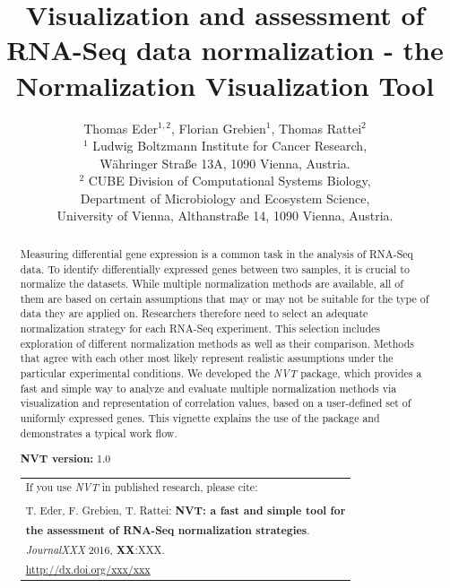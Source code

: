 \documentclass[11pt]{article}\usepackage[]{graphicx}\usepackage[usenames,dvipsnames]{color}
\author{Thomas Eder$^{1,2}$, Florian Grebien$^{1}$, Thomas Rattei$^{2}$\\[1em]
  \small{$^{1}$ Ludwig Boltzmann Institute for Cancer Research,} \\
  \small{W{\"a}hringer Stra{\ss}e 13A, 1090 Vienna, Austria.} \\
  \small{$^{2}$ CUBE Division of Computational Systems Biology,} \\
  \small{Department of Microbiology and Ecosystem Science,} \\
  \small{University of Vienna, Althanstra{\ss}e 14, 1090 Vienna, Austria.} }
\title{Visualization and assessment of RNA-Seq data normalization - the Normalization Visualization Tool}
\newcommand{\nvt}{\textit{NVT}}
\begin{document}
\maketitle

\begin{abstract}

Measuring differential gene expression is a common task in the analysis of RNA-Seq data.
To identify differentially expressed genes between two samples, it is crucial to normalize the datasets.
While multiple normalization methods are available, all of them are based on certain assumptions that
may or may not be suitable for the type of data they are applied on. Researchers therefore need to select
an adequate normalization strategy for each RNA-Seq experiment. This selection includes exploration of
different normalization methods as well as their comparison. Methods that agree with each other most
likely represent realistic assumptions under the particular experimental conditions.
We developed the \nvt{} package, which provides a fast and simple way to analyze and evaluate
multiple normalization methods via visualization and representation of correlation values, based on a user-defined set of uniformly expressed genes. This vignette explains the use of the package and demonstrates a typical work flow.

  \vspace{1em}

  \textbf{NVT version:} 1.0

  \vspace{1em}

  \begin{center}
    \begin{tabular}{ | l | }
      \hline
      If you use \nvt{} in published research, please cite:  \\
      \\
      T. Eder, F. Grebien, T. Rattei: \textbf{NVT: a fast and simple tool for} \\
      \textbf{the assessment of RNA-Seq normalization strategies}. \\
      \emph{JournalXXX} 2016, \textbf{XX}:XXX. \\
      \url{http://dx.doi.org/xxx/xxx}  \\
      \hline
    \end{tabular}
  \end{center}

\end{abstract}

\newpage
\end{document}
